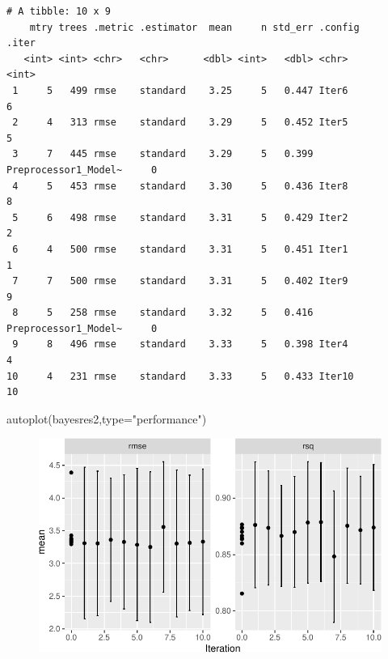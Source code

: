 \documentclass[
  letterpaper,
  DIV=11,
  numbers=noendperiod]{scrartcl}
\newenvironment{Shaded}{\begin{snugshade}}{\end{snugshade}}
\newcommand{\AttributeTok}[1]{\textcolor[rgb]{0.40,0.45,0.13}{#1}}
\newcommand{\FunctionTok}[1]{\textcolor[rgb]{0.28,0.35,0.67}{#1}}
\newcommand{\NormalTok}[1]{\textcolor[rgb]{0.00,0.23,0.31}{#1}}
\newcommand{\StringTok}[1]{\textcolor[rgb]{0.13,0.47,0.30}{#1}}
\begin{document}
\begin{verbatim}
# A tibble: 10 x 9
    mtry trees .metric .estimator  mean     n std_err .config              .iter
   <int> <int> <chr>   <chr>      <dbl> <int>   <dbl> <chr>                <int>
 1     5   499 rmse    standard    3.25     5   0.447 Iter6                    6
 2     4   313 rmse    standard    3.29     5   0.452 Iter5                    5
 3     7   445 rmse    standard    3.29     5   0.399 Preprocessor1_Model~     0
 4     5   453 rmse    standard    3.30     5   0.436 Iter8                    8
 5     6   498 rmse    standard    3.31     5   0.429 Iter2                    2
 6     4   500 rmse    standard    3.31     5   0.451 Iter1                    1
 7     7   500 rmse    standard    3.31     5   0.402 Iter9                    9
 8     5   258 rmse    standard    3.32     5   0.416 Preprocessor1_Model~     0
 9     8   496 rmse    standard    3.33     5   0.398 Iter4                    4
10     4   231 rmse    standard    3.33     5   0.433 Iter10                  10
\end{verbatim}

\begin{Shaded}
\begin{Highlighting}[]
\FunctionTok{autoplot}\NormalTok{(bayesres2,}\AttributeTok{type=}\StringTok{"performance"}\NormalTok{)}
\end{Highlighting}
\end{Shaded}

\begin{figure}[H]

{\centering \includegraphics{L16_files/figure-pdf/unnamed-chunk-6-1.pdf}

}

\end{figure}
\end{document}
